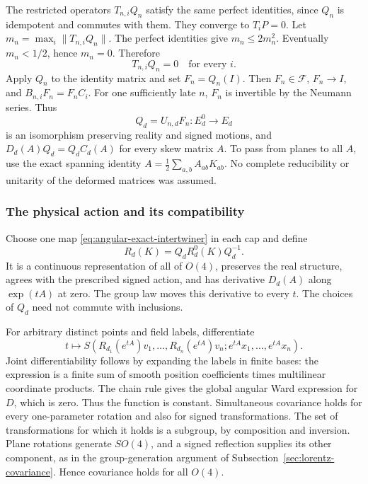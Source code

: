 The restricted operators $T_{n,i}Q_n$ satisfy the same perfect identities,
since $Q_n$ is idempotent and commutes with them. They converge to
$T_iP=0$. Let $m_n=\max_i\|T_{n,i}Q_n\|$. The perfect identities give
$m_n\leq2m_n^2$. Eventually $m_n<1/2$, hence $m_n=0$. Therefore
\[
                        T_{n,i}Q_n=0\quad\text{for every }i.
\]
Apply $Q_n$ to the identity matrix and set $F_n=Q_n(I)$. Then
$F_n\in\mathcal F$, $F_n\to I$, and
$B_{n,i}F_n=F_nC_i$. For one sufficiently late $n$, $F_n$ is invertible
by the Neumann series. Thus
\begin{equation}\label{eq:angular-exact-intertwiner}
              Q_d=U_{n,d}F_n:E_d^0\longrightarrow E_d
\end{equation}
is an isomorphism preserving reality and signed motions, and
$D_d(A)Q_d=Q_dC_d(A)$ for every skew matrix $A$.
To pass from planes to all $A$, use the exact spanning identity
$A=\frac12\sum_{a,b}A_{ab}K_{ab}$. No complete reducibility or
unitarity of the deformed matrices was assumed.

\subsubsection{The physical action and its compatibility}

Choose one map \eqref{eq:angular-exact-intertwiner} in each cap and define
\[
                         R_d(K)=Q_dR_d^0(K)Q_d^{-1}.
\]
It is a continuous representation of all of $O(4)$, preserves the real
structure, agrees with the prescribed signed action, and has derivative
$D_d(A)$ along $\exp(tA)$ at zero. The group law moves this derivative
to every $t$. The choices of $Q_d$ need not commute with inclusions.

For arbitrary distinct points and field labels, differentiate
\[
 t\longmapsto S(R_{d_1}(e^{tA})v_1,\ldots,
                     R_{d_n}(e^{tA})v_n;e^{tA}x_1,\ldots,e^{tA}x_n).
\]
Joint differentiability follows by expanding the labels in finite bases:
the expression is a finite sum of smooth position coefficients times
multilinear coordinate products. The chain rule gives the global angular
Ward expression for $D$, which is zero. Thus the function is constant.
Simultaneous covariance holds for every one-parameter rotation and also
for signed transformations. The set of transformations for which it
holds is a subgroup, by composition and inversion. Plane rotations
generate $SO(4)$, and a signed reflection supplies its other component,
as in the group-generation argument of
Subsection~\ref{sec:lorentz-covariance}. Hence covariance holds for all $O(4)$.

